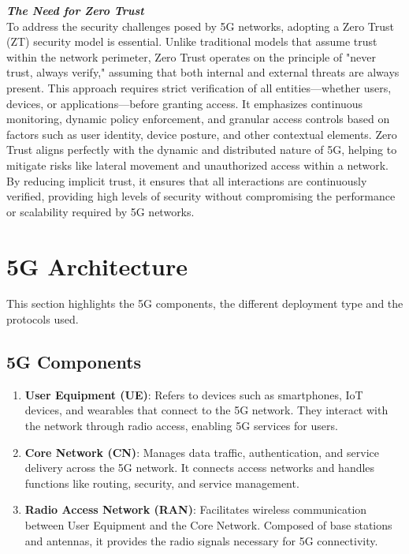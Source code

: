 \documentclass{report}
\begin{document}
\textbf{\textit{The Need for Zero Trust}}\\
To address the security challenges posed by 5G networks, adopting a Zero Trust (ZT) security model is essential. Unlike traditional models that assume trust within the network perimeter, Zero Trust operates on the principle of "never trust, always verify," assuming that both internal and external threats are always present. This approach requires strict verification of all entities—whether users, devices, or applications—before granting access. It emphasizes continuous monitoring, dynamic policy enforcement, and granular access controls based on factors such as user identity, device posture, and other contextual elements. Zero Trust aligns perfectly with the dynamic and distributed nature of 5G, helping to mitigate risks like lateral movement and unauthorized access within a network. By reducing implicit trust, it ensures that all interactions are continuously verified, providing high levels of security without compromising the performance or scalability required by 5G networks.
\section{5G Architecture}
This section highlights the 5G components, the different deployment type and the protocols used.
\subsection{5G Components}
\begin{enumerate}
    \item \textbf{User Equipment (UE)}: Refers to devices such as smartphones, IoT devices, and wearables that connect to the 5G network. They interact with the network through radio access, enabling 5G services for users.
    \item \textbf{Core Network (CN)}: Manages data traffic, authentication, and service delivery across the 5G network. It connects access networks and handles functions like routing, security, and service management.
    \item \textbf{Radio Access Network (RAN)}: Facilitates wireless communication between User Equipment and the Core Network. Composed of base stations and antennas, it provides the radio signals necessary for 5G connectivity.
\end{enumerate}
\end{document}
